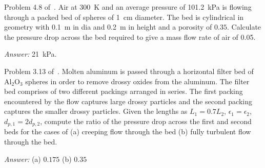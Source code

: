 

\begin{question}
	Problem 4.8 of~\cite{gaskell}. Air at \SI{300}{\kelvin} and an average pressure of \SI{101.2}{\kilo\pascal} is flowing through a packed bed of spheres of \SI{1}{\cm} diameter. The bed is cylindrical in geometry with \SI{0.1}{\metre} in dia and \SI{0.2}{\metre} in height and a porosity of $0.35$. Calculate the pressure drop across the bed required to give a mass flow rate of air of \SI{0.05}{\kgps}.
\end{question}
\begin{solution}[print]
{\it Answer:} \SI{21}{\kilo\pascal}.
\end{solution}


\begin{question}
Problem 3.13 of~\cite{gp}. Molten aluminum is passed through a horizontal filter bed of $\mathrm{Al_2O_3}$ spheres in order to remove drossy oxides from the aluminum. The filter bed comprises of two different packings arranged in series. The first packing encountered by the flow captures large drossy particles and the second packing captures the smaller drossy particles. Given the lengths as $L_1 = 0.7 L_2$, $\epsilon_1 = \epsilon_2$, $d_{p,1} = 2 d_{p,2}$, compute the ratio of the pressure drop across the first and second beds for the cases of (a) creeping flow through the bed (b) fully turbulent flow through the bed.
\end{question}
\begin{solution}[print]
{\it Answer:} (a) $0.175$ (b) $0.35$
\end{solution}

